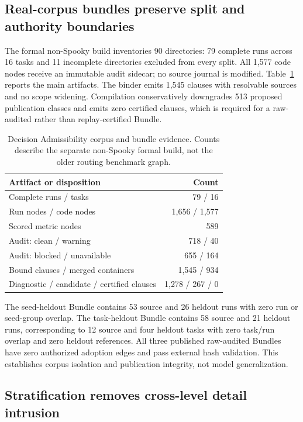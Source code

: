 \documentclass{article}
\begin{document}
\subsection{Real-corpus bundles preserve split and authority boundaries}

The formal non-Spooky build inventories 90 directories: 79 complete runs across
16 tasks and 11 incomplete directories excluded from every split.  All 1,577
code nodes receive an immutable audit sidecar; no source journal is modified.
Table~\ref{tab:bundle} reports the main artifacts.  The binder emits 1,545
clauses with resolvable sources and no scope widening.  Compilation conservatively
downgrades 513 proposed publication classes and emits zero certified clauses,
which is required for a raw-audited rather than replay-certified Bundle.

\begin{table}[t]
\caption{Decision Admissibility corpus and bundle evidence.  Counts describe
the separate non-Spooky formal build, not the older routing benchmark graph.}
\label{tab:bundle}
\centering
\small
\begin{tabular}{lr}
\toprule
Artifact or disposition & Count \\
\midrule
Complete runs / tasks & 79 / 16 \\
Run nodes / code nodes & 1,656 / 1,577 \\
Scored metric nodes & 589 \\
Audit: clean / warning & 718 / 40 \\
Audit: blocked / unavailable & 655 / 164 \\
Bound clauses / merged containers & 1,545 / 934 \\
Diagnostic / candidate / certified clauses & 1,278 / 267 / 0 \\
\bottomrule
\end{tabular}
\end{table}

The seed-heldout Bundle contains 53 source and 26 heldout runs with zero run or
seed-group overlap.  The task-heldout Bundle contains 58 source and 21 heldout
runs, corresponding to 12 source and four heldout tasks with zero task/run
overlap and zero heldout references.  All three published raw-audited Bundles
have zero authorized adoption edges and pass external hash validation.  This
establishes corpus isolation and publication integrity, not model
generalization.

\subsection{Stratification removes cross-level detail intrusion}
\end{document}
